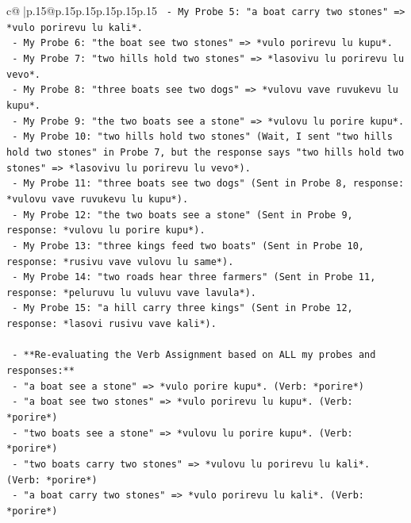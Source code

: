 \documentclass{article}
\begin{document}
{\begin{supertabular}{c@{$\;$}|p{.15\linewidth}@{}p{.15\linewidth}p{.15\linewidth}p{.15\linewidth}p{.15\linewidth}p{.15\linewidth}}
{{{\texttt{           {-} My Probe 5: "a boat carry two stones" => *vulo porirevu lu kali*.} \\
\texttt{           {-} My Probe 6: "the boat see two stones" => *vulo porirevu lu kupu*.} \\
\texttt{           {-} My Probe 7: "two hills hold two stones" => *lasovivu lu porirevu lu vevo*.} \\
\texttt{           {-} My Probe 8: "three boats see two dogs" => *vulovu vave ruvukevu lu kupu*.} \\
\texttt{           {-} My Probe 9: "the two boats see a stone" => *vulovu lu porire kupu*.} \\
\texttt{           {-} My Probe 10: "two hills hold two stones" (Wait, I sent "two hills hold two stones" in Probe 7, but the response says "two hills hold two stones" => *lasovivu lu porirevu lu vevo*).} \\
\texttt{           {-} My Probe 11: "three boats see two dogs" (Sent in Probe 8, response: *vulovu vave ruvukevu lu kupu*).} \\
\texttt{           {-} My Probe 12: "the two boats see a stone" (Sent in Probe 9, response: *vulovu lu porire kupu*).} \\
\texttt{           {-} My Probe 13: "three kings feed two boats" (Sent in Probe 10, response: *rusivu vave vulovu lu same*).} \\
\texttt{           {-} My Probe 14: "two roads hear three farmers" (Sent in Probe 11, response: *peluruvu lu vuluvu vave lavula*).} \\
\texttt{           {-} My Probe 15: "a hill carry three kings" (Sent in Probe 12, response: *lasovi rusivu vave kali*).} \\
\\ 
\texttt{   {-} **Re{-}evaluating the Verb Assignment based on ALL my probes and responses:**} \\
\texttt{     {-} "a boat see a stone" => *vulo porire kupu*. (Verb: *porire*)} \\
\texttt{     {-} "a boat see two stones" => *vulo porirevu lu kupu*. (Verb: *porire*)} \\
\texttt{     {-} "two boats see a stone" => *vulovu lu porire kupu*. (Verb: *porire*)} \\
\texttt{     {-} "two boats carry two stones" => *vulovu lu porirevu lu kali*. (Verb: *porire*)} \\
\texttt{     {-} "a boat carry two stones" => *vulo porirevu lu kali*. (Verb: *porire*)} \\
}}}
\end{supertabular}}
\end{document}
